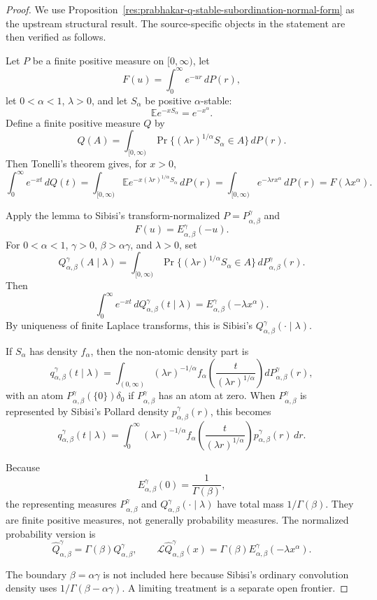 \documentclass[11pt]{article}
\numberwithin{equation}{section}
\theoremstyle{definition}
\theoremstyle{remark}
\newcommand{\1}{\mathbf 1}
\begin{document}
\begin{proof}
We use Proposition~\ref{res:prabhakar-q-stable-subordination-normal-form} as the upstream structural result. The source-specific objects in the statement are then verified as follows.

Let \(P\) be a finite positive measure on \([0,\infty)\), let
\[
F(u)=\int_0^\infty e^{-ur}\,dP(r),
\]
let \(0<\alpha<1\), \(\lambda>0\), and let \(S_\alpha\) be positive \(\alpha\)-stable:
\[
\mathbb E e^{-xS_\alpha}=e^{-x^\alpha}.
\]
Define a finite positive measure \(Q\) by
\[
Q(A)=\int_{[0,\infty)}
\Pr\{(\lambda r)^{1/\alpha}S_\alpha\in A\}\,dP(r).
\]
Then Tonelli's theorem gives, for \(x>0\),
\[
\int_0^\infty e^{-xt}\,dQ(t)
=\int_{[0,\infty)}
\mathbb E e^{-x(\lambda r)^{1/\alpha}S_\alpha}\,dP(r)
=\int_{[0,\infty)}e^{-\lambda r x^\alpha}\,dP(r)
=F(\lambda x^\alpha).
\]

Apply the lemma to Sibisi's transform-normalized \(P=P^\gamma_{\alpha,\beta}\) and
\[
F(u)=E^\gamma_{\alpha,\beta}(-u).
\]
For \(0<\alpha<1\), \(\gamma>0\), \(\beta>\alpha\gamma\), and \(\lambda>0\), set
\[
Q^\gamma_{\alpha,\beta}(A\mid\lambda)
=\int_{[0,\infty)}
\Pr\{(\lambda r)^{1/\alpha}S_\alpha\in A\}\,
dP^\gamma_{\alpha,\beta}(r).
\]
Then
\[
\int_0^\infty e^{-xt}\,dQ^\gamma_{\alpha,\beta}(t\mid\lambda)
=E^\gamma_{\alpha,\beta}(-\lambda x^\alpha).
\]
By uniqueness of finite Laplace transforms, this is Sibisi's \(Q^\gamma_{\alpha,\beta}(\cdot\mid\lambda)\).

If \(S_\alpha\) has density \(f_\alpha\), then the non-atomic density part is
\[
q^\gamma_{\alpha,\beta}(t\mid\lambda)
=\int_{(0,\infty)}
(\lambda r)^{-1/\alpha}
f_\alpha\!\left(\frac{t}{(\lambda r)^{1/\alpha}}\right)
dP^\gamma_{\alpha,\beta}(r),
\]
with an atom \(P^\gamma_{\alpha,\beta}(\{0\})\delta_0\) if \(P^\gamma_{\alpha,\beta}\) has an atom at zero. When \(P^\gamma_{\alpha,\beta}\) is represented by Sibisi's Pollard density \(p^\gamma_{\alpha,\beta}(r)\), this becomes
\[
q^\gamma_{\alpha,\beta}(t\mid\lambda)
=\int_0^\infty
(\lambda r)^{-1/\alpha}
f_\alpha\!\left(\frac{t}{(\lambda r)^{1/\alpha}}\right)
p^\gamma_{\alpha,\beta}(r)\,dr.
\]

Because
\[
E^\gamma_{\alpha,\beta}(0)=\frac1{\Gamma(\beta)},
\]
the representing measures \(P^\gamma_{\alpha,\beta}\) and \(Q^\gamma_{\alpha,\beta}(\cdot\mid\lambda)\) have total mass \(1/\Gamma(\beta)\). They are finite positive measures, not generally probability measures. The normalized probability version is
\[
\widehat Q^\gamma_{\alpha,\beta}=\Gamma(\beta)Q^\gamma_{\alpha,\beta},
\qquad
\mathcal L\widehat Q^\gamma_{\alpha,\beta}(x)
=\Gamma(\beta)E^\gamma_{\alpha,\beta}(-\lambda x^\alpha).
\]

The boundary \(\beta=\alpha\gamma\) is not included here because Sibisi's ordinary convolution density uses \(1/\Gamma(\beta-\alpha\gamma)\). A limiting treatment is a separate open frontier.
\end{proof}
\end{document}
